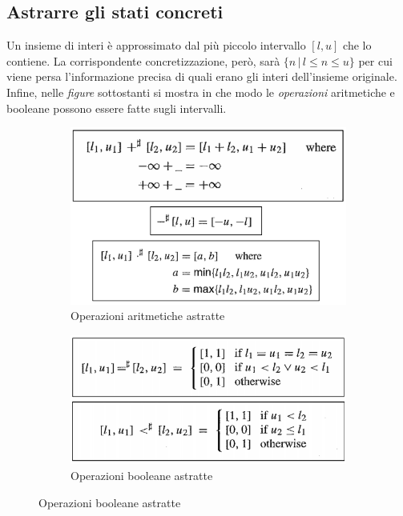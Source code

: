 \documentclass[a4paper,oneside,titlepage]{book}
\begin{document}
\subsection{Astrarre gli stati concreti}
Un insieme di interi è approssimato dal più piccolo intervallo $[l,u]$ che lo contiene. La corrispondente concretizzazione, però, sarà $\{ n \, | \, l \leq n \leq u \}$ per cui viene persa l'informazione precisa di quali erano gli interi dell'insieme originale. Infine, nelle \textit{figure} sottostanti si mostra in che modo le \textit{operazioni} aritmetiche e booleane possono essere fatte sugli intervalli.
\begin{figure}[htp]
	\begin{subfigure}{0.49\textwidth}
	    \centering
		\includegraphics[width=\textwidth, height=\textheight, keepaspectratio]{int4.png}
		\caption{Operazioni aritmetiche astratte}
	\end{subfigure}
	\hfill
	\begin{subfigure}{0.49\textwidth}
	    \centering
		\includegraphics[width=\textwidth, height=\textheight, keepaspectratio]{int5.png} 
		\caption{Operazioni booleane astratte}
	\end{subfigure}
\end{figure}
\end{document}

